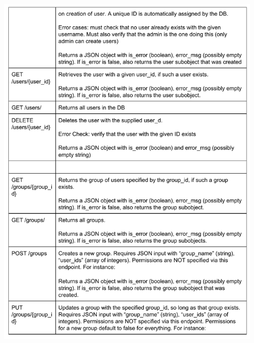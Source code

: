 \documentclass[12pt]{article}
\begin{document}
\includegraphics[width=6in]{../ev3/apispec_05.pdf}
\end{document}

